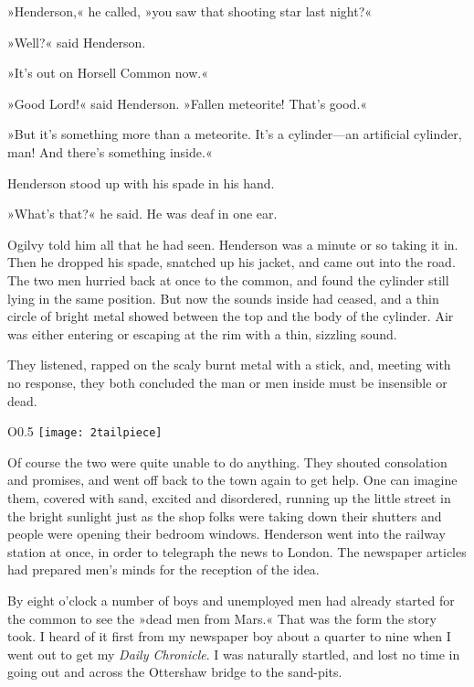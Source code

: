 »Henderson,« he called, »you saw that shooting star last night?«

»Well?« said Henderson.

»It's out on Horsell Common now.«

»Good Lord!« said Henderson. »Fallen meteorite! That's good.«

»But it's something more than a meteorite. It's a cylinder—an artificial cylinder, man! And there's something inside.«

Henderson stood up with his spade in his hand.

»What's that?« he said. He was deaf in one ear.

Ogilvy told him all that he had seen. Henderson was a minute or so taking it in. Then he dropped his spade, snatched up his jacket, and came out into the road. The two men hurried back at once to the common, and found the cylinder still lying in the same position. But now the sounds inside had ceased, and a thin circle of bright metal showed between the top and the body of the cylinder. Air was either entering or escaping at the rim with a thin, sizzling sound.

They listened, rapped on the scaly burnt metal with a stick, and, meeting with no response, they both concluded the man or men inside must be insensible or dead.

\begin{wrapfigure}{O}{0.5\textwidth}
\centering
\texttt{[image: 2tailpiece]}
\end{wrapfigure}

Of course the two were quite unable to do anything. They shouted consolation and promises, and went off back to the town again to get help. One can imagine them, covered with sand, excited and disordered, running up the little street in the bright sunlight just as the shop folks were taking down their shutters and people were opening their bedroom windows. Henderson went into the railway station at once, in order to telegraph the news to London. The newspaper articles had prepared men's minds for the reception of the idea.

By eight o'clock a number of boys and unemployed men had already started for the common to see the »dead men from Mars.« That was the form the story took. I heard of it first from my newspaper boy about a quarter to nine when I went out to get my \textit{Daily Chronicle}. I was naturally startled, and lost no time in going out and across the Ottershaw bridge to the sand-pits.

